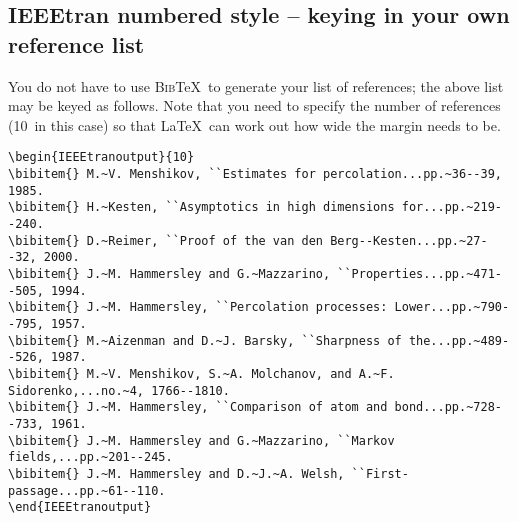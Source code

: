 \subsection*{IEEEtran numbered style -- keying in your own reference list}
You do not have to use \textsc{Bib}\TeX\ to generate your list of references; the above list may be keyed as follows. Note that you need to specify the number of references (10~in this case) so that \LaTeX\ can work out how wide the margin needs to be.
\begin{verbatim}
\begin{IEEEtranoutput}{10}
\bibitem{} M.~V. Menshikov, ``Estimates for percolation...pp.~36--39, 1985.
\bibitem{} H.~Kesten, ``Asymptotics in high dimensions for...pp.~219--240.
\bibitem{} D.~Reimer, ``Proof of the van den Berg--Kesten...pp.~27--32, 2000.
\bibitem{} J.~M. Hammersley and G.~Mazzarino, ``Properties...pp.~471--505, 1994.
\bibitem{} J.~M. Hammersley, ``Percolation processes: Lower...pp.~790--795, 1957.
\bibitem{} M.~Aizenman and D.~J. Barsky, ``Sharpness of the...pp.~489--526, 1987.
\bibitem{} M.~V. Menshikov, S.~A. Molchanov, and A.~F. Sidorenko,...no.~4, 1766--1810.
\bibitem{} J.~M. Hammersley, ``Comparison of atom and bond...pp.~728--733, 1961.
\bibitem{} J.~M. Hammersley and G.~Mazzarino, ``Markov fields,...pp.~201--245.
\bibitem{} J.~M. Hammersley and D.~J.~A. Welsh, ``First-passage...pp.~61--110.
\end{IEEEtranoutput}
\end{verbatim}

\nocite{MenshEst}
\nocite{Kasymp}
\nocite{Reimer}
\nocite{HamMaz94}
\nocite{HamLower}
\nocite{AiBar87}
\nocite{MMS}
\nocite{HamAtomBond}
\nocite{HamMaz83}
\nocite{HamWelsh}

\endinput